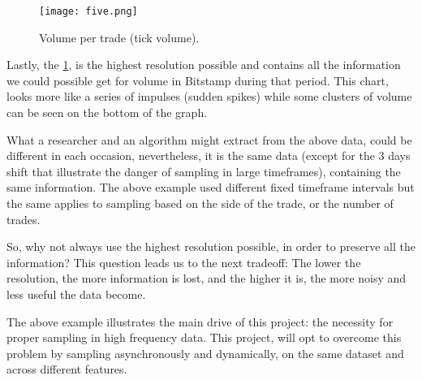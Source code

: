 \begin{figure}[h]
    \centering
    \texttt{[image: five.png]}
    \caption{Volume per trade (tick volume).}
    \label{fig:tick_vol}
\end{figure}

Lastly, the \ref{fig:tick_vol}, is the highest resolution possible and contains all the information we could possible get for volume in Bitstamp during that period. This chart, looks more like a series of impulses (sudden spikes) while some clusters of volume can be seen on the bottom of the graph. 

What a researcher and an algorithm might extract from the above data, could be different in
each occasion, nevertheless, it is the same data (except for the 3 days shift that illustrate the danger of sampling in large timeframes), containing the same information. The above example used different fixed timeframe intervals but the same applies to sampling based on the side of the trade, or the number of trades. 

So, why not always use the highest resolution possible, in order to preserve all the information? This question leads us to the next tradeoff: The lower the resolution, the more information is lost, and the higher it is, the more noisy and less useful the data become.

The above example illustrates the main drive of this project: the necessity for proper sampling in high frequency data. This project, will opt to overcome this problem by sampling asynchronously and
dynamically, on the same dataset and across different features.


